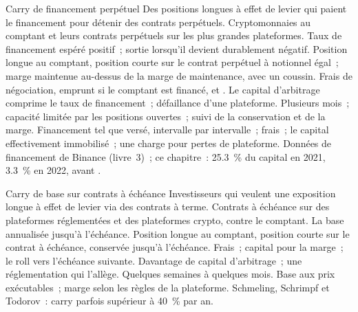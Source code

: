 \begin{strategyfile}{Carry de financement perpétuel}\label{strat:s1:crypto-medium-frequency-strategies:funding}
 Des positions longues à effet de levier qui paient le financement pour détenir des contrats perpétuels.
 Cryptomonnaies au comptant et leurs contrats perpétuels sur les plus grandes plateformes.
 Taux de financement espéré positif~; sortie lorsqu'il devient durablement négatif.
 Position longue au comptant, position courte sur le contrat perpétuel à notionnel égal~; marge maintenue au-dessus de la marge de maintenance, avec un coussin.
 Frais de négociation, emprunt si le comptant est financé, et .
 Le capital d'arbitrage comprime le taux de financement~; défaillance d'une plateforme.
 Plusieurs mois~; capacité limitée par les positions ouvertes~; suivi de la conservation et de la marge.
 Financement tel que versé, intervalle par intervalle~; frais~; le capital effectivement immobilisé~; une charge pour pertes de plateforme.
 Données de financement de Binance (livre~3)~; ce chapitre~: 25.3~\% du capital en 2021, 3.3~\% en 2022, avant .
\end{strategyfile}

\begin{strategyfile}{Carry de base sur contrats à échéance}\label{strat:s1:crypto-medium-frequency-strategies:basis}
 Investisseurs qui veulent une exposition longue à effet de levier via des contrats à terme.
 Contrats à échéance sur des plateformes réglementées et des plateformes crypto, contre le comptant.
 La base annualisée jusqu'à l'échéance.
 Position longue au comptant, position courte sur le contrat à échéance, conservée jusqu'à l'échéance.
 Frais~; capital pour la marge~; le roll vers l'échéance suivante.
 Davantage de capital d'arbitrage~; une réglementation qui l'allège.
 Quelques semaines à quelques mois.
 Base aux prix exécutables~; marge selon les règles de la plateforme.
 Schmeling, Schrimpf et Todorov~: carry parfois supérieur à 40~\% par an.
\end{strategyfile}

